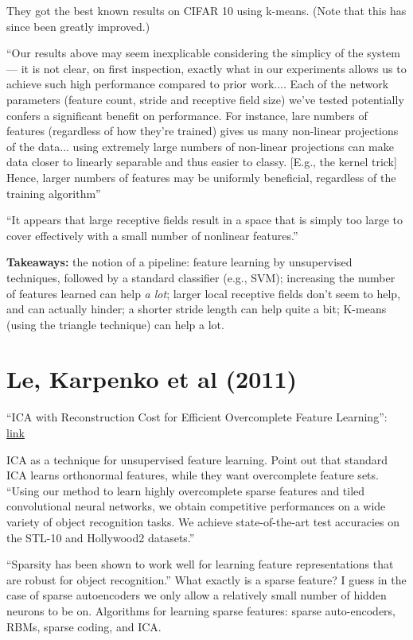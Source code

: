 \documentclass[12pt]{report}
\newcommand{\link}[2]{\href{#1}{#2}}
\begin{document}
They got the best known results on CIFAR 10 using k-means.  (Note that
this has since been greatly improved.)

``Our results above may seem inexplicable considering the simplicy of
the system --- it is not clear, on first inspection, exactly what in
our experiments allows us to achieve such high performance compared to
prior work.... Each of the network parameters (feature count, stride
and receptive field size) we've tested potentially confers a
significant benefit on performance.  For instance, lare numbers of
features (regardless of how they're trained) gives us many non-linear
projections of the data... using extremely large numbers of non-linear
projections can make data closer to linearly separable and thus easier
to classy.  [E.g., the kernel trick] Hence, larger numbers of features
may be uniformly beneficial, regardless of the training algorithm''

``It appears that large receptive fields result in a space that is
simply too large to cover effectively with a small number of nonlinear
features.''

\textbf{Takeaways:} the notion of a pipeline: feature learning by
unsupervised techniques, followed by a standard classifier (e.g.,
SVM); increasing the number of features learned can help \emph{a lot};
larger local receptive fields don't seem to help, and can actually
hinder; a shorter stride length can help quite a bit; K-means (using
the triangle technique) can help a lot.
 
\section{Le, Karpenko et al (2011)}

``ICA with Reconstruction Cost for Efficient Overcomplete Feature
Learning'':
\link{http://ai.stanford.edu/~ang/papers/nips11-ICAReconstructionCost.pdf}{link}

ICA as a technique for unsupervised feature learning.  Point out that
standard ICA learns orthonormal features, while they want overcomplete
feature sets.  ``Using our method to learn highly overcomplete sparse
features and tiled convolutional neural networks, we obtain
competitive performances on a wide variety of object recognition
tasks.  We achieve state-of-the-art test accuracies on the STL-10 and
Hollywood2 datasets.''

``Sparsity has been shown to work well for learning feature
representations that are robust for object recognition.''  What
exactly is a sparse feature?  I guess in the case of sparse
autoencoders we only allow a relatively small number of hidden neurons
to be on.  Algorithms for learning sparse features: sparse
auto-encoders, RBMs, sparse coding, and ICA.
\end{document}
